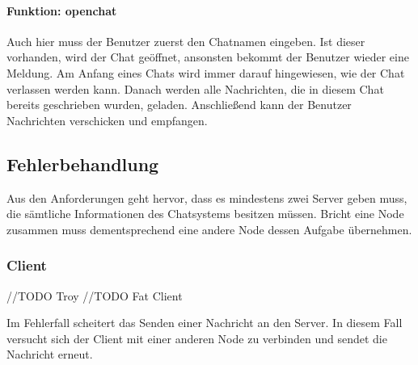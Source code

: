 \paragraph{Funktion: openchat}
Auch hier muss der Benutzer zuerst den Chatnamen eingeben. Ist dieser vorhanden, wird der Chat geöffnet, ansonsten
bekommt der Benutzer wieder eine Meldung. Am Anfang eines Chats wird immer darauf hingewiesen, wie der Chat
verlassen werden kann. Danach werden alle Nachrichten, die in diesem Chat bereits geschrieben wurden, geladen.
Anschließend kann der Benutzer Nachrichten verschicken und empfangen.

\author{Matthias Vonend, Aaron Schweig, Troy Keßler}
\subsection{Fehlerbehandlung}
Aus den Anforderungen geht hervor, dass es mindestens zwei Server geben muss, die sämtliche Informationen des
Chatsystems besitzen müssen. Bricht eine Node zusammen muss dementsprechend eine andere Node dessen Aufgabe übernehmen.

\subsubsection{Client}
//TODO Troy
//TODO Fat Client

Im Fehlerfall scheitert das Senden einer Nachricht an den Server. In diesem Fall versucht sich der Client mit
einer anderen Node zu verbinden und sendet die Nachricht erneut.

